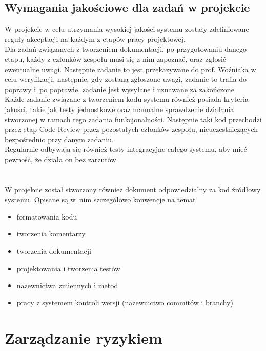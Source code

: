 \documentclass{article}
\begin{document}
\subsection{Wymagania jakościowe dla zadań w projekcie}

W projekcie w celu utrzymania wysokiej jakości systemu zostały zdefiniowane reguły akceptacji na każdym z etapów pracy projektowej. \\
Dla zadań związanych z tworzeniem dokumentacji, po przygotowaniu danego etapu, każdy z członków zespołu musi się z nim zapoznać, oraz zgłosić ewentualne uwagi. Następnie zadanie to jest przekazywane do prof. Woźniaka w celu weryfikacji, następnie, gdy zostaną zgłoszone uwagi, zadanie to trafia do poprawy i~po poprawie, zadanie jest wysyłane i uznawane za zakończone. \\
Każde zadanie związane z tworzeniem kodu systemu również posiada kryteria jakości, takie jak testy jednostkowe oraz manualne sprawdzenie działania stworzonej w ramach tego zadania funkcjonalności. Następnie taki kod przechodzi przez etap Code Review przez pozostałych członków zespołu, nieuczestniczących bezpośrednio przy danym zadaniu.\\
Regularnie odbywają się również testy integracyjne całego systemu, aby mieć pewność, że działa on bez zarzutów.
\mbox{}\\\mbox{}\\\mbox{}\\
W projekcie został stworzony również dokument odpowiedzialny za kod źródłowy systemu. Opisane są w~nim szczegółowo konwencje na temat
\begin{itemize}
\item formatowania kodu
\item tworzenia komentarzy
\item tworzenia dokumentacji
\item projektowania i tworzenia testów
\item nazewnictwa zmiennych i metod
\item pracy z systemem kontroli wersji (nazewnictwo commitów i branchy)
\end{itemize}



\section{Zarządzanie ryzykiem}
\end{document}
